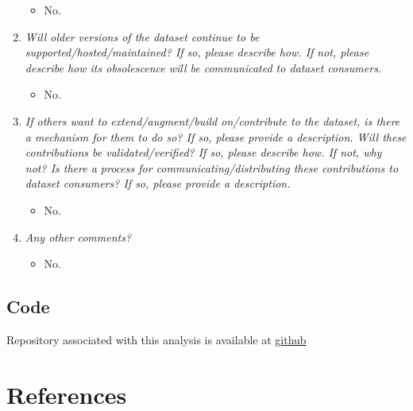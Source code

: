 \documentclass[
]{article}
\providecommand{\tightlist}{%
  \setlength{\itemsep}{0pt}\setlength{\parskip}{0pt}}
\begin{document}
\begin{enumerate}
  \begin{itemize}
  \tightlist
  \item
    No.
  \end{itemize}
\item
  \emph{Will older versions of the dataset continue to be supported/hosted/maintained? If so, please describe how. If not, please describe how its obsolescence will be communicated to dataset consumers.}

  \begin{itemize}
  \tightlist
  \item
    No.
  \end{itemize}
\item
  \emph{If others want to extend/augment/build on/contribute to the dataset, is there a mechanism for them to do so? If so, please provide a description. Will these contributions be validated/verified? If so, please describe how. If not, why not? Is there a process for communicating/distributing these contributions to dataset consumers? If so, please provide a description.}

  \begin{itemize}
  \tightlist
  \item
    No.
  \end{itemize}
\item
  \emph{Any other comments?}

  \begin{itemize}
  \tightlist
  \item
    No.
  \end{itemize}
\end{enumerate}

\hypertarget{code}{%
\subsection*{Code}\label{code}}

Repository associated with this analysis is available at \href{https://github.com/Jon-Goodwin/Final}{github}

\newpage

\hypertarget{references}{%
\section*{References}\label{references}}
\end{document}
